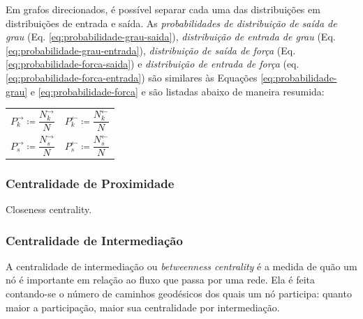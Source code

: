 \documentclass[12pt,a4paper]{article}
\theoremstyle{hypo}
\newcommand{\defn}{\coloneqq} %
\newcommand{\linkin}[1]{#1^\leftarrow} %
\newcommand{\linkout}[1]{#1^\rightarrow} %
\begin{document}
Em grafos direcionados, é possível separar cada uma das distribuições em distribuições de entrada e saída. As \textit{probabilidades de distribuição de saída de grau} (Eq. \ref{eq:probabilidade-grau-saida}), \textit{distribuição de entrada de grau} (Eq. \ref{eq:probabilidade-grau-entrada}), \textit{distribuição de saída de força} (Eq. \ref{eq:probabilidade-forca-saida}) e \textit{distribuição de entrada de força} (eq. \ref{eq:probabilidade-forca-entrada}) são similares às Equações \ref{eq:probabilidade-grau} e \ref{eq:probabilidade-forca} e são listadas abaixo de maneira resumida:

\noindent
\begin{tabularx}{\linewidth}{@{}XX@{}}
  \begin{equation} \label{eq:probabilidade-grau-saida}
  	\linkout{P}_k \defn \frac{\linkout{N}_k}{N}
  \end{equation} &
  \begin{equation} \label{eq:probabilidade-grau-entrada}
  	\linkin{P}_k \defn \frac{\linkin{N}_k}{N}
  \end{equation} \\
  \begin{equation} \label{eq:probabilidade-forca-saida}
  	\linkout{P}_s \defn \frac{\linkout{N}_s}{N}
  \end{equation} &
  \begin{equation} \label{eq:probabilidade-forca-entrada}
  	\linkin{P}_s \defn \frac{\linkin{N}_s}{N}
  \end{equation}
\end{tabularx}


\subsubsection{Centralidade de Proximidade}

Closeness centrality.

\subsubsection{Centralidade de Intermediação}

A centralidade de intermediação ou \textit{betweenness centrality} é a medida de quão um nó é importante em relação ao fluxo que passa por uma rede. Ela é feita contando-se o número de caminhos geodésicos dos quais um nó participa: quanto maior a participação, maior sua centralidade por intermediação.
\end{document}
